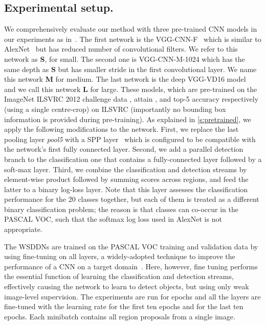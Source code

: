 \documentclass[10pt,twocolumn,letterpaper]{article}
\begin{document}
\subsection{Experimental setup.}\label{subsec:expsetup}
We comprehensively evaluate our method with three pre-trained CNN models in our experiments as in~\cite{Girshick15}. The first network is the VGG-CNN-F~\cite{Chatfield14} which is similar to AlexNet~\cite{Krizhevsky12} but has reduced number of convolutional filters. We refer to this network as \textbf{S}, for small. The second one is VGG-CNN-M-1024 which has the same depth as \textbf{S} but has smaller stride in the first convolutional layer. We name this network \textbf{M} for medium. The last network is the deep VGG-VD16 model~\cite{Simonyan15} and we call this network \textbf{L} for large. These models, which are pre-trained on the ImageNet ILSVRC 2012 challenge data \cite{Russakovsky15}, attain  ,  and  top-5 accuracy respectively (using a single centre-crop) on ILSVRC (importantly no bounding box information is provided during pre-training). As explained in \cref{s:pretrained}, we apply the following modifications to the network. First, we replace the last pooling layer \textit{pool5} with a SPP layer~\cite{He14} which is configured to be compatible with the network's first fully connected layer. Second, we add a parallel detection branch to the classification one that contains a fully-connected layer followed by a soft-max layer. Third, we combine the classification and detection streams by element-wise product followed by summing scores across regions, and feed the latter to a binary log-loss layer. Note that this layer assesses the classification performance for the 20 classes together, but each of them is treated as a different binary classification problem; the reason is that classes can co-occur in the PASCAL VOC, such that the softmax log loss used in AlexNet is not appropriate.

The WSDDNs are trained on the PASCAL VOC training and validation data by using fine-tuning on all layers, a widely-adopted technique to improve the performance of a CNN on a target domain~\cite{Chatfield14}. Here, however, fine tuning performs the essential function of learning the classification and detection streams, effectively causing the network to learn to detect objects, but using only weak image-level supervision. The experiments are run for  epochs and all the layers are fine-tuned with the learning rate  for the first ten epochs and  for the last ten epochs. Each minibatch contains all region proposals from a single image.
\end{document}
